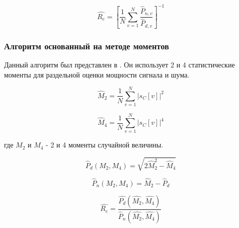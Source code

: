 \begin{center}
\begin{equation}
	\hat{R_e} = \left[ \frac{1}{N} \sum \limits_{v=1}^{N} \frac{\hat P_{n,v}}{\hat P_{d,v}} \right]^{-1}
\end{equation}
\end{center}

\subsubsection{Алгоритм основанный на методе моментов}
\label{sssec:mm}
Данный алгоритм был представлен в \cite{snr_pauluzzi}. Он использует 2 и 4 статистические моменты для раздельной оценки
мощности сигнала и шума.
\begin{center}
\begin{equation}
	\hat M_2 = \frac{1}{N} \sum \limits_{v=1}^{N} \left|s_C[v] \right| ^2
\end{equation}
\end{center}
\begin{center}
\begin{equation}
	\hat M_4 = \frac{1}{N} \sum \limits_{v=1}^{N} \left|s_C[v] \right| ^4
\end{equation}
\end{center}
где ${M_2}$ и ${M_4}$ - 2 и 4 моменты случайной величины.

\begin{center}
\begin{equation}
	\hat P_d(M_2, M_4) = \sqrt{2 \hat M^2_2 - \hat M_4} 
\end{equation}
\end{center}

\begin{center}
\begin{equation}
	\hat P_n(M_2, M_4) = \hat M_2 - \hat P_d
\end{equation}
\end{center}

\begin{center}
\begin{equation}
	\hat{R_e} = \frac{\hat{P_d}(\hat{M_2}, \hat{M_4})}{\hat P_n(\hat{M_2}, \hat{M_4})}
\end{equation}
\end{center}

